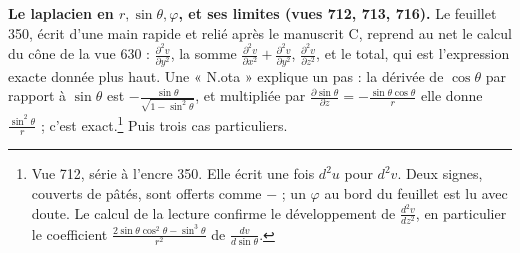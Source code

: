 \documentclass[11pt,a4paper]{article}
\begin{document}
\textbf{Le laplacien en $r, \sin\theta, \varphi$, et ses limites (vues 712,
713, 716).} Le feuillet 350, écrit d'une main rapide et relié après le manuscrit
C, reprend au net le calcul du cône de la vue 630 : $\frac{\partial^2
v}{\partial y^2}$, la somme $\frac{\partial^2 v}{\partial x^2} +
\frac{\partial^2 v}{\partial y^2}$, $\frac{\partial^2 v}{\partial z^2}$, et le
total, qui est l'expression exacte donnée plus haut. Une « N.ota » explique un
pas : la dérivée de $\cos\theta$ par rapport à $\sin\theta$ est
$-\frac{\sin\theta}{\sqrt{1 - \sin^2\theta}}$, et multipliée par
$\frac{\partial\sin\theta}{\partial z} = -\frac{\sin\theta\cos\theta}{r}$ elle
donne $\frac{\sin^2\theta}{r}$ ; c'est exact.\footnote{Vue 712, série à l'encre
350. Elle écrit une fois $d^2u$ pour $d^2v$. Deux signes, couverts de pâtés,
sont offerts comme $-$ ; un $\varphi$ au bord du feuillet est lu avec doute. Le
calcul de la lecture confirme le développement de $\frac{d^2v}{dz^2}$, en
particulier le coefficient $\frac{2\sin\theta\cos^2\theta - \sin^3\theta}{r^2}$
de $\frac{dv}{d\sin\theta}$.} Puis trois cas particuliers.
\end{document}
